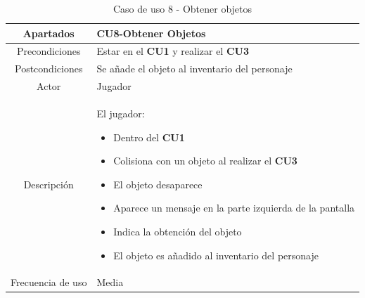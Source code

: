\documentclass[a4paper]{article}
\begin{document}
\begin{table}[!ht]
    \centering
    \begin{tabular}{|c|p{12cm}|}
        \hline
        \textbf{Apartados} & \textbf{CU8-Obtener Objetos}                        \\
        \hline
        Precondiciones     & Estar en el \textbf{CU1} y realizar el \textbf{CU3} \\
        \hline
        Postcondiciones    & Se añade el objeto al inventario del personaje      \\
        \hline
        Actor              & Jugador                                             \\
        \hline
        Descripción        & El jugador:
        \begin{itemize}
            \item Dentro del \textbf{CU1}
            \item Colisiona con un objeto al realizar el \textbf{CU3}
            \item El objeto desaparece
            \item Aparece un mensaje en la parte izquierda de la pantalla
            \item[\faAngleRight] Indica la obtención del objeto
            \item[\faAngleRight] El objeto es añadido al inventario del personaje
        \end{itemize}    \\
        \hline
        Frecuencia de uso  & Media                                               \\
        \hline
    \end{tabular}
    \caption{Caso de uso 8 - Obtener objetos}
    \label{tab:casosdeuso8-table}
\end{table}
\end{document}
